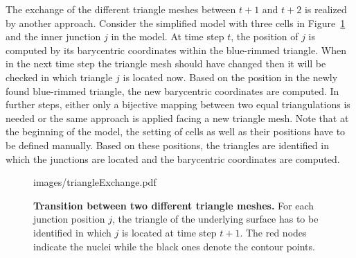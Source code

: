\documentclass[11pt,a4paper, final]{article}
\begin{document}
The exchange of the different triangle meshes between $t+1$ and $t+2$ is realized by another approach. Consider the simplified model with three cells in Figure~\ref{fig:triangleExchange} and the inner junction $j$ in the model. At time step $t$, the position of $j$ is computed by its barycentric coordinates within the blue-rimmed triangle. When in the next time step the triangle mesh should have changed then it will be checked in which triangle $j$ is located now. Based on the position in the newly found blue-rimmed triangle, the new barycentric coordinates are computed. In further steps, either only a bijective mapping between two equal triangulations is needed or the same approach is applied facing a new triangle mesh. Note that at the beginning of the model, the setting of cells as well as their positions have to be defined manually. Based on these positions, the triangles are identified in which the junctions are located and the barycentric coordinates are computed.
%
\begin{figure}[htbp]
	\begin{center}
		\begin{overpic}[width=0.8\linewidth]{images/triangleExchange.pdf}
		\end{overpic}
\caption[Transition between two different triangle meshes.]
{
{\bf Transition between two different triangle meshes.} For each junction position $j$, the triangle of the underlying surface has to be identified in which $j$ is located at time step $t+1$. The red nodes indicate the nuclei while the black ones denote the contour points.
}
	\label{fig:triangleExchange}
	\end{center}
\end{figure}
%
\end{document}
